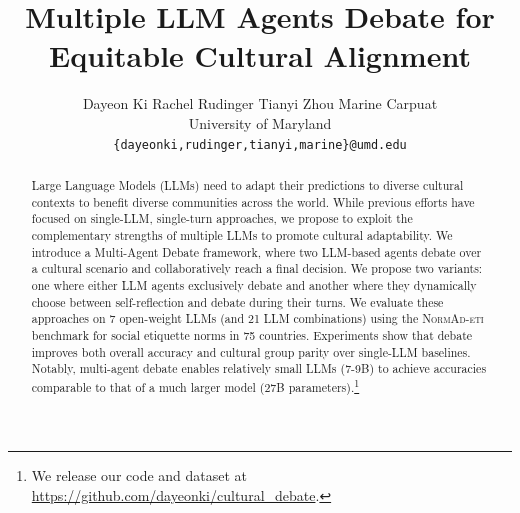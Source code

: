 \documentclass[11pt]{article}
\title{Multiple LLM Agents Debate for Equitable Cultural Alignment}
\author{
Dayeon Ki \quad 
Rachel Rudinger \quad 
Tianyi Zhou \quad 
Marine Carpuat \\
University of Maryland \\
\texttt{\{dayeonki,rudinger,tianyi,marine\}@umd.edu}
}
\begin{document}
\maketitle

\begin{abstract}




Large Language Models (LLMs) need to adapt their predictions to diverse cultural contexts to benefit diverse communities across the world. While previous efforts have focused on single-LLM, single-turn approaches, we propose to exploit the complementary strengths of multiple LLMs to promote cultural adaptability. We introduce a Multi-Agent Debate framework, where two LLM-based agents debate over a cultural scenario and collaboratively reach a final decision. We propose two variants: one where either LLM agents exclusively debate and another where they dynamically choose between self-reflection and debate during their turns. We evaluate these approaches on 7 open-weight LLMs (and 21 LLM combinations)  using the \textsc{NormAd-eti} benchmark for social etiquette norms in 75 countries. Experiments show that debate improves both overall accuracy and cultural group parity over single-LLM baselines. Notably, multi-agent debate enables relatively small LLMs (7-9\textsc{B}) to achieve accuracies comparable to that of a much larger model (27\textsc{B} parameters).\footnote{We release our code and dataset at \url{https://github.com/dayeonki/cultural_debate}.}





\end{abstract}
\end{document}
